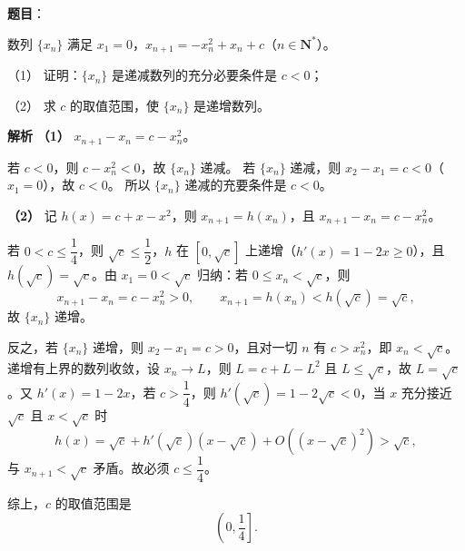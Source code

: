 \begin{answer}

\textbf{题目}：

数列 $\{x_n\}$ 满足 $x_1=0$，$x_{n+1}=-x_n^2+x_n+c$（$n\in\mathbf N^*$）。

（1） 证明：$\{x_n\}$ 是递减数列的充分必要条件是 $c<0$；

（2） 求 $c$ 的取值范围，使 $\{x_n\}$ 是递增数列。

\textbf{解析}
\textbf{（1）} $x_{n+1}-x_n=c-x_n^2$。

若 $c<0$，则 $c-x_n^2<0$，故 $\{x_n\}$ 递减。
若 $\{x_n\}$ 递减，则 $x_2-x_1=c<0$（$x_1=0$），故 $c<0$。
所以 $\{x_n\}$ 递减的充要条件是 $c<0$。

\textbf{（2）} 记 $h(x)=c+x-x^2$，则 $x_{n+1}=h(x_n)$，且 $x_{n+1}-x_n=c-x_n^2$。

若 $0<c\leqslant\dfrac14$，则 $\sqrt c\leqslant\dfrac12$，$h$ 在 $\left[0,\sqrt c\right]$ 上递增（$h'(x)=1-2x\geqslant0$），且 $h\left(\sqrt c\right)=\sqrt c$。由 $x_1=0<\sqrt c$ 归纳：若 $0\leqslant x_n<\sqrt c$，则
\nopagebreak[4]
\[x_{n+1}-x_n=c-x_n^2>0,\qquad x_{n+1}=h(x_n)<h\left(\sqrt c\right)=\sqrt c,\]
故 $\{x_n\}$ 递增。

反之，若 $\{x_n\}$ 递增，则 $x_2-x_1=c>0$，且对一切 $n$ 有 $c>x_n^2$，即 $x_n<\sqrt c$。递增有上界的数列收敛，设 $x_n\to L$，则 $L=c+L-L^2$ 且 $L\leqslant\sqrt c$，故 $L=\sqrt c$。又 $h'(x)=1-2x$，若 $c>\dfrac14$，则 $h'\left(\sqrt c\right)=1-2\sqrt c<0$，当 $x$ 充分接近 $\sqrt c$ 且 $x<\sqrt c$ 时
\nopagebreak[4]
\[h(x)=\sqrt c+h'\left(\sqrt c\right)(x-\sqrt c)+O\left((x-\sqrt c)^2\right)>\sqrt c,\]
与 $x_{n+1}<\sqrt c$ 矛盾。故必须 $c\leqslant\dfrac14$。

综上，$c$ 的取值范围是
\nopagebreak[4]
\[\left(0,\frac14\right].\]



\end{answer}